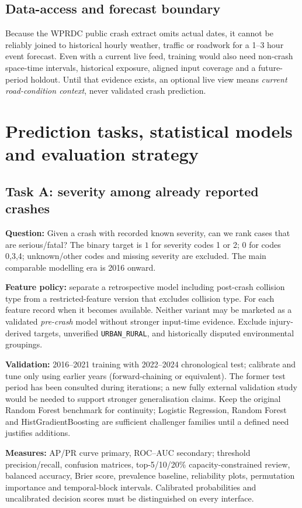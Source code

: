 \documentclass[11pt,a4paper,openany]{report}
\newcommand{\pathcode}[1]{\nolinkurl{#1}}
\begin{document}
\section{Data-access and forecast boundary}
Because the WPRDC public crash extract omits actual dates, it cannot be reliably joined to historical hourly weather, traffic or roadwork for a 1--3 hour event forecast. Even with a current live feed, training would also need non-crash space-time intervals, historical exposure, aligned input coverage and a future-period holdout. Until that evidence exists, an optional live view means \emph{current road-condition context}, never validated crash prediction.

\chapter{Prediction tasks, statistical models and evaluation strategy}
\section{Task A: severity among already reported crashes}
\textbf{Question:} Given a crash with recorded known severity, can we rank cases that are serious/fatal? The binary target is $1$ for severity codes 1 or 2; $0$ for codes 0,3,4; unknown/other codes and missing severity are excluded. The main comparable modelling era is 2016 onward.

\textbf{Feature policy:} separate a retrospective model including post-crash collision type from a restricted-feature version that excludes collision type. For each feature record when it becomes available. Neither variant may be marketed as a validated \emph{pre-crash} model without stronger input-time evidence. Exclude injury-derived targets, unverified \pathcode{URBAN_RURAL}, and historically disputed environmental groupings.

\textbf{Validation:} 2016--2021 training with 2022--2024 chronological test; calibrate and tune only using earlier years (forward-chaining or equivalent). The former test period has been consulted during iterations; a new fully external validation study would be needed to support stronger generalisation claims. Keep the original Random Forest benchmark for continuity; Logistic Regression, Random Forest and HistGradientBoosting are sufficient challenger families until a defined need justifies additions.

\textbf{Measures:} AP/PR curve primary, ROC--AUC secondary; threshold precision/recall, confusion matrices, top-5/10/20\% capacity-constrained review, balanced accuracy, Brier score, prevalence baseline, reliability plots, permutation importance and temporal-block intervals. Calibrated probabilities and uncalibrated decision scores must be distinguished on every interface.
\end{document}
